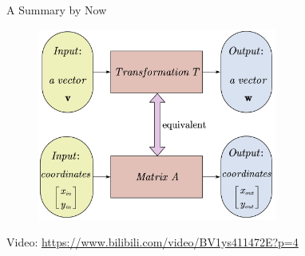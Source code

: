 \documentclass{beamer}
\begin{document}
\begin{frame}{A Summary by Now}
    \begin{figure}
        \centering
        \includegraphics[width=0.7\textwidth]{transformation2.jpg}
    \end{figure}

    \begin{center}
        Video: \url{https://www.bilibili.com/video/BV1ys411472E?p=4}
    \end{center}

\end{frame}
\end{document}
